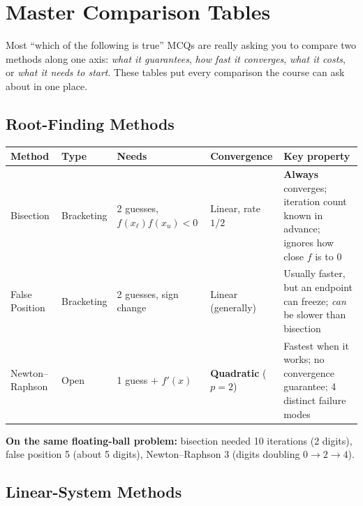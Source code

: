 \section{Master Comparison Tables}

\begin{keypoint}
Most ``which of the following is true'' MCQs are really asking you to compare two methods along one axis: \emph{what it guarantees}, \emph{how fast it converges}, \emph{what it costs}, or \emph{what it needs to start}. These tables put every comparison the course can ask about in one place.
\end{keypoint}

\subsection{Root-Finding Methods}

\begin{center}\small
\renewcommand{\arraystretch}{1.4}
\begin{tabular}{@{}p{}p{}p{}p{}p{}@{}}
\toprule
\textbf{Method} & \textbf{Type} & \textbf{Needs} & \textbf{Convergence} & \textbf{Key property} \\
\midrule
Bisection & Bracketing & 2 guesses, $f(x_\ell)f(x_u)<0$ & Linear, rate $1/2$ & \textbf{Always} converges; iteration count known in advance; ignores how close $f$ is to 0 \\
False Position & Bracketing & 2 guesses, sign change & Linear (generally) & Usually faster, but an endpoint can freeze; \emph{can} be slower than bisection \\
Newton--Raphson & Open & 1 guess $+$ $f'(x)$ & \textbf{Quadratic} ($p=2$) & Fastest when it works; no convergence guarantee; 4 distinct failure modes \\
\bottomrule
\end{tabular}
\end{center}

\vspace{4pt}
\noindent\textbf{On the same floating-ball problem:} bisection needed 10 iterations (2 digits), false position 5 (about 5 digits), Newton--Raphson 3 (digits doubling $0\to2\to4$).

\subsection{Linear-System Methods}

